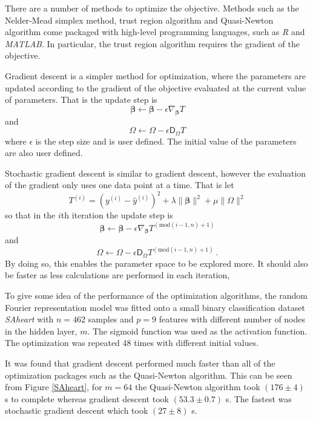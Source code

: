 \documentclass{article} %
\newcommand{\vectGreek}[1]{\boldsymbol{#1}}
\newcommand{\matr}[1]{\mathsf{#1}}
\begin{document}
There are a number of methods to optimize the objective. Methods such as the Nelder-Mead simplex method, trust region algorithm and Quasi-Newton algorithm come packaged with high-level programming languages, such as \emph{R} and \emph{MATLAB}. In particular, the trust region algorithm requires the gradient of the objective.

Gradient descent is a simpler method for optimization, where the parameters are updated according to the gradient of the objective evaluated at the current value of parameters. That is the update step is
\begin{equation}
\vectGreek{\beta} \leftarrow \vectGreek{\beta} - \epsilon \nabla_{\vectGreek{\beta}}T
\end{equation}
and
\begin{equation}
\matr{\Omega} \leftarrow \matr{\Omega} - \epsilon \matr{D_{\Omega}}T
\end{equation}
where $\epsilon$ is the step size and is user defined. The initial value of the parameters are also user defined.

Stochastic gradient descent is similar to gradient descent, however the evaluation of the gradient only uses one data point at a time. That is let
\begin{equation}
T^{(i)} =
\left(
	y^{(i)}-\hat{y}^{(i)}
\right)^2
+\lambda\|\vectGreek{\beta}\|^2
+\mu\|\matr{\Omega}\|^2
\end{equation}
so that in the $i$th iteration the update step is
\begin{equation}
\vectGreek{\beta} \leftarrow \vectGreek{\beta} - \epsilon \nabla_{\vectGreek{\beta}}T^{(\text{mod}(i-1,n)+1)}
\end{equation}
and
\begin{equation}
\matr{\Omega} \leftarrow \matr{\Omega} - \epsilon \matr{D_{\Omega}}T^{(\text{mod}(i-1,n)+1)} \ .
\end{equation}
By doing so, this enables the parameter space to be explored more. It should also be faster as less calculations are performed in each iteration,

To give some idea of the performance of the optimization algorithms, the random Fourier representation model was fitted onto a small binary classification dataset \emph{SAheart} with $n=462$ samples and $p=9$ features with different number of nodes in the hidden layer, $m$. The sigmoid function was used as the activation function. The optimization was repeated 48 times with different initial values.

It was found that gradient descent performed much faster than all of the optimization packages such as the Quasi-Newton algorithm. This can be seen from Figure \ref{SAheart}, for $m=64$ the Quasi-Newton algorithm took $(176\pm 4)$ s to complete whereas gradient descent took $(53.3\pm 0.7)$ s. The fastest was stochastic gradient descent which took $(27\pm 8)$ s.
\end{document}
